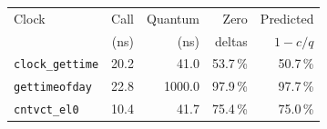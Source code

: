 \begin{tabular}{lrrrr}
\toprule
Clock & Call & Quantum & Zero & Predicted \\
 & (ns) & (ns) & deltas & $1-c/q$ \\
\midrule
\texttt{clock\_gettime} & 20.2 & 41.0 & 53.7\,\% & 50.7\,\% \\
\texttt{gettimeofday} & 22.8 & 1000.0 & 97.9\,\% & 97.7\,\% \\
\texttt{cntvct\_el0} & 10.4 & 41.7 & 75.4\,\% & 75.0\,\% \\
\bottomrule
\end{tabular}
